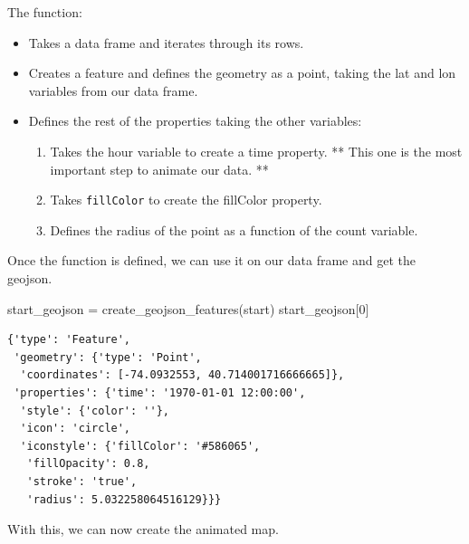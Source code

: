 \documentclass[
  letterpaper,
  DIV=11,
  numbers=noendperiod]{scrreprt}
\newenvironment{Shaded}{\begin{snugshade}}{\end{snugshade}}
\newcommand{\DecValTok}[1]{\textcolor[rgb]{0.68,0.00,0.00}{#1}}
\newcommand{\NormalTok}[1]{\textcolor[rgb]{0.00,0.23,0.31}{#1}}
\newcommand{\OperatorTok}[1]{\textcolor[rgb]{0.37,0.37,0.37}{#1}}
\providecommand{\tightlist}{%
  \setlength{\itemsep}{0pt}\setlength{\parskip}{0pt}}\usepackage{longtable,booktabs,array}
\begin{document}
The function:

\begin{itemize}
\tightlist
\item
  Takes a data frame and iterates through its rows.
\item
  Creates a feature and defines the geometry as a point, taking the lat
  and lon variables from our data frame.
\item
  Defines the rest of the properties taking the other variables:

  \begin{enumerate}
  \def\labelenumi{\arabic{enumi}.}
  \tightlist
  \item
    Takes the hour variable to create a time property. ** This one is
    the most important step to animate our data. **
  \item
    Takes \texttt{fillColor} to create the fillColor property.
  \item
    Defines the radius of the point as a function of the count variable.
  \end{enumerate}
\end{itemize}

Once the function is defined, we can use it on our data frame and get
the geojson.

\begin{Shaded}
\begin{Highlighting}[]
\NormalTok{start\_geojson }\OperatorTok{=}\NormalTok{ create\_geojson\_features(start)}
\NormalTok{start\_geojson[}\DecValTok{0}\NormalTok{]}
\end{Highlighting}
\end{Shaded}

\begin{verbatim}
{'type': 'Feature',
 'geometry': {'type': 'Point',
  'coordinates': [-74.0932553, 40.714001716666665]},
 'properties': {'time': '1970-01-01 12:00:00',
  'style': {'color': ''},
  'icon': 'circle',
  'iconstyle': {'fillColor': '#586065',
   'fillOpacity': 0.8,
   'stroke': 'true',
   'radius': 5.032258064516129}}}
\end{verbatim}

With this, we can now create the animated map.
\end{document}
